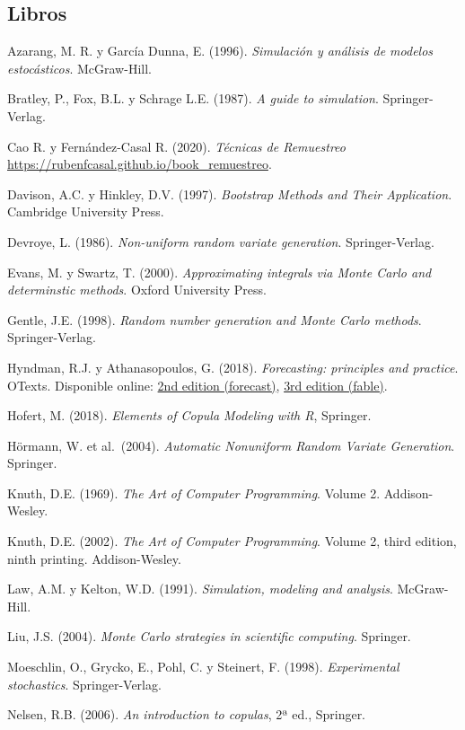 \documentclass[
]{book}
\theoremstyle{break}
\theoremstyle{definition}
\theoremstyle{definition}
\theoremstyle{definition}
\theoremstyle{remark}
\begin{document}
\hypertarget{libros}{%
\subsection*{Libros}\label{libros}}

Azarang, M. R. y García Dunna, E. (1996). \emph{Simulación y análisis de modelos estocásticos}. McGraw-Hill.

Bratley, P., Fox, B.L. y Schrage L.E. (1987). \emph{A guide to simulation}. Springer-Verlag.

Cao R. y Fernández-Casal R. (2020). \emph{Técnicas de Remuestreo} \url{https://rubenfcasal.github.io/book_remuestreo}.

Davison, A.C. y Hinkley, D.V. (1997). \emph{Bootstrap Methods and Their Application}. Cambridge University Press.

Devroye, L. (1986). \emph{Non-uniform random variate generation}. Springer-Verlag.

Evans, M. y Swartz, T. (2000). \emph{Approximating integrals via Monte Carlo and determinstic methods}. Oxford University Press.

Gentle, J.E. (1998). \emph{Random number generation and Monte Carlo methods}. Springer-Verlag.

Hyndman, R.J. y Athanasopoulos, G. (2018). \emph{Forecasting: principles and practice}. OTexts.
Disponible online: \href{https://otexts.com/fpp2}{2nd edition (forecast)}, \href{https://otexts.com/fpp3}{3rd edition (fable)}.

Hofert, M. (2018). \emph{Elements of Copula Modeling with R}, Springer.

Hörmann, W. et al.~(2004). \emph{Automatic Nonuniform Random Variate Generation}. Springer.

Knuth, D.E. (1969). \emph{The Art of Computer Programming}. Volume 2. Addison-Wesley.

Knuth, D.E. (2002). \emph{The Art of Computer Programming}. Volume 2, third edition, ninth printing. Addison-Wesley.

Law, A.M. y Kelton, W.D. (1991). \emph{Simulation, modeling and analysis}. McGraw-Hill.

Liu, J.S. (2004). \emph{Monte Carlo strategies in scientific computing}. Springer.

Moeschlin, O., Grycko, E., Pohl, C. y Steinert, F. (1998). \emph{Experimental stochastics}. Springer-Verlag.

Nelsen, R.B. (2006). \emph{An introduction to copulas}, 2ª ed., Springer.
\end{document}
